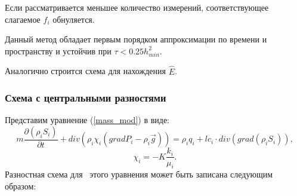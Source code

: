 Если рассматривается меньшее количество измерений,
соответствующее слагаемое $f_i$ обнуляется.

Данный метод обладает первым порядком аппроксимации по времени
и пространству и устойчив при $\tau < 0.25 h_{min}^2$.

Аналогично строится схема для нахождения $\widehat{E}$.

\subsubsection*{Схема с центральными разностями}

Представим уравнение (\ref{mass_mod}) в виде:
 \begin{equation}
 	 m \frac{\partial (\rho_i S_i)}{\partial t}+ div(\rho_i \chi_i (grad P_i - {\rho}_i\overrightarrow{g})) = \rho_i q_i + l c_i \cdot div(grad(\rho_i S_i)),
 \end{equation}
 $$\chi_i=-K\frac{k_i}{\mu_i}.$$
Разностная схема для~ этого уравнения может быть записана следующим
образом:

